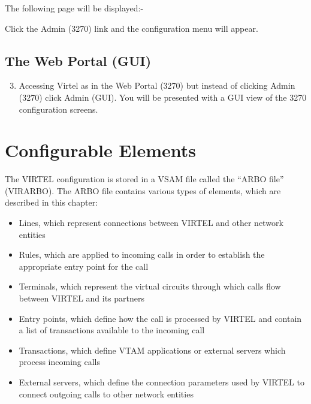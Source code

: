 \documentclass[letterpaper,10pt,english]{sphinxmanual}
\begin{document}
The following page will be displayed:-


Click the Admin (3270) link and the configuration menu will appear.


\newpage


\subsection{The Web Portal (GUI)}
\label{\detokenize{connectivity_guide:the-web-portal-gui}}\begin{enumerate}
\setcounter{enumi}{2}
\item {} 
Accessing Virtel as in the Web Portal (3270) but instead of clicking Admin (3270) click Admin (GUI). You will be presented with a GUI view of the 3270 configuration screens.

\end{enumerate}


\newpage


\section{Configurable Elements}
\label{\detokenize{connectivity_guide:configurable-elements}}
The VIRTEL configuration is stored in a VSAM file called the “ARBO file” (VIRARBO). The ARBO file contains various types of elements, which are described in this chapter:
\begin{itemize}
\item {} 
Lines, which represent connections between VIRTEL and other network entities

\item {} 
Rules, which are applied to incoming calls in order to establish the appropriate entry point for the call

\item {} 
Terminals, which represent the virtual circuits through which calls flow between VIRTEL and its partners

\item {} 
Entry points, which define how the call is processed by VIRTEL and contain a list of transactions available to the incoming call

\item {} 
Transactions, which define VTAM applications or external servers which process incoming calls

\item {} 
External servers, which define the connection parameters used by VIRTEL to connect outgoing calls to other network entities

\end{itemize}
\end{document}
